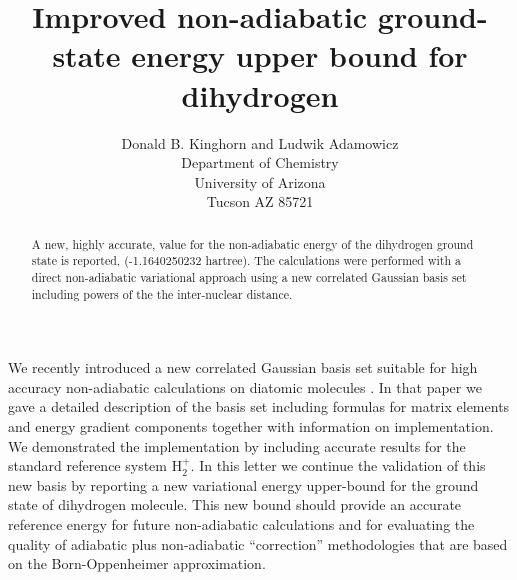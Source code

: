 \documentclass[12pt]{article}
\begin{document}
\title{Improved non-adiabatic ground-state energy upper bound for dihydrogen}
\author{Donald B. Kinghorn and Ludwik Adamowicz\\
        Department of Chemistry\\
        University of Arizona\\
        Tucson AZ 85721}
\maketitle

\begin{abstract}
A new, highly accurate, value for the non-adiabatic energy 
of the dihydrogen ground state is reported, (-1.1640250232 hartree).
The calculations were performed with a direct non-adiabatic variational
approach using a new correlated {G}aussian basis set including powers of the
the inter-nuclear distance.    
\end{abstract}

We recently introduced a new correlated Gaussian basis set suitable
for high accuracy non-adiabatic calculations on diatomic molecules
\cite{Kinghorn99a}.
In that paper we gave a detailed description of the basis set including
formulas for matrix elements and energy gradient components together with 
information on implementation. We demonstrated the implementation by
including accurate results for the standard reference system H$_{2}^{+}$.
In this letter we continue the validation of this new basis by reporting
a new variational energy upper-bound for the ground state of dihydrogen 
molecule. This new bound should provide an accurate reference energy
for future non-adiabatic calculations and for evaluating the quality
of adiabatic plus non-adiabatic ``correction'' methodologies
that are based on the Born-Oppenheimer approximation. 
\end{document}
